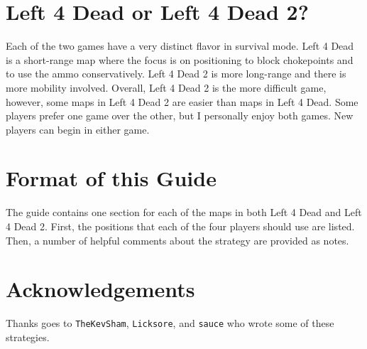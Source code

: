\section{Left 4 Dead or Left 4 Dead 2?}
Each of the two games have a very distinct flavor in survival mode. Left 4 Dead is a short-range map where the focus is on positioning to block chokepoints and to use the ammo conservatively. Left 4 Dead 2 is more long-range and there is more mobility involved. Overall, Left 4 Dead 2 is the more difficult game, however, some maps in Left 4 Dead 2 are easier than maps in Left 4 Dead. Some players prefer one game over the other, but I personally enjoy both games. New players can begin in either game.

\section{Format of this Guide}
The guide contains one section for each of the maps in both Left 4 Dead and Left 4 Dead 2. First, the positions that each of the four players should use are listed. Then, a number of helpful comments about the strategy are provided as notes.

\section{Acknowledgements}
Thanks goes to \texttt{TheKevSham}, \texttt{Licksore}, and \texttt{sauce} who wrote some of these strategies.
